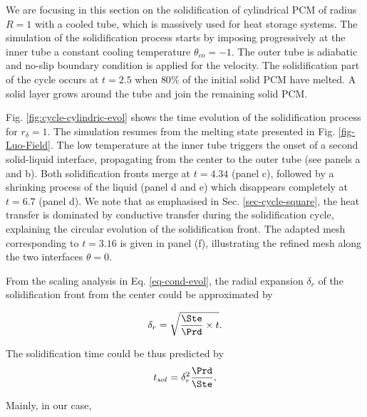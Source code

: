 We are focusing in this section on the solidification of cylindrical PCM of radius $R=1$ with a cooled tube, which is massively used for heat storage systems.
The simulation of the solidification process starts by imposing progressively at the inner tube a constant cooling temperature $\theta_{co} = -1$.
The outer tube is adiabatic and no-slip boundary condition is applied for the velocity.
The solidification part of the cycle occurs at $t = 2.5$ when $80 \%$ of the initial solid PCM have melted.
A solid layer grows around the tube and join the remaining solid PCM.

Fig. \ref{fig:cycle-cylindric-evol} shows the time evolution of the solidification process for $r_{\delta} = 1$.
The simulation resumes from the melting state presented in Fig. \ref{fig-Luo-Field}.
The low temperature at the inner tube triggers the onset of a second solid-liquid interface, propagating from the center to the outer tube (see panels a and b).
Both solidification fronts merge  at $t = 4.34$ (panel c), followed by a shrinking process of the liquid (panel d and e) which disappears completely at $t = 6.7$ (panel d).
We note that as emphasised in Sec. \ref{sec-cycle-square}, the heat transfer is dominated by conductive transfer during the solidification cycle, explaining the circular evolution of the solidification front.
The adapted mesh corresponding to $t = 3.16$ is given in panel (f), illustrating the refined mesh along the two interfaces $\theta = 0$.

From the scaling analysis in Eq. \ref{eq-cond-evol}, the radial expansion $\delta_r$ of the solidification front from the center could be approximated by

\begin{equation}
	\delta_r = \sqrt{\frac{\Ste}{\Prd}\times t}.
\end{equation}

\noindent The solidification time could be thus predicted by
\begin{equation}
	t_{sol} = \delta_r^2 \frac{\Prd}{\Ste},
\end{equation}

\noindent Mainly, in our case, 

